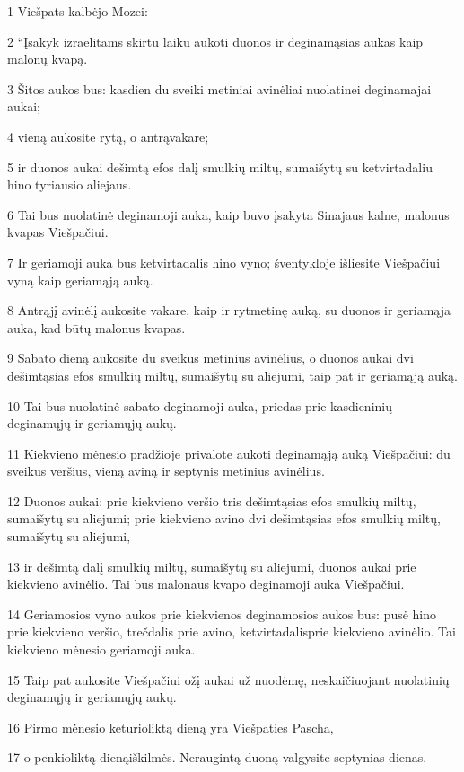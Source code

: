 \par 1 Viešpats kalbėjo Mozei: 
\par 2 “Įsakyk izraelitams skirtu laiku aukoti duonos ir deginamąsias aukas kaip malonų kvapą. 
\par 3 Šitos aukos bus: kasdien du sveiki metiniai avinėliai nuolatinei deginamajai aukai; 
\par 4 vieną aukosite rytą, o antrą­vakare; 
\par 5 ir duonos aukai dešimtą efos dalį smulkių miltų, sumaišytų su ketvirtadaliu hino tyriausio aliejaus. 
\par 6 Tai bus nuolatinė deginamoji auka, kaip buvo įsakyta Sinajaus kalne, malonus kvapas Viešpačiui. 
\par 7 Ir geriamoji auka bus ketvirtadalis hino vyno; šventykloje išliesite Viešpačiui vyną kaip geriamąją auką. 
\par 8 Antrąjį avinėlį aukosite vakare, kaip ir rytmetinę auką, su duonos ir geriamąja auka, kad būtų malonus kvapas. 
\par 9 Sabato dieną aukosite du sveikus metinius avinėlius, o duonos aukai­ dvi dešimtąsias efos smulkių miltų, sumaišytų su aliejumi, taip pat ir geriamąją auką. 
\par 10 Tai bus nuolatinė sabato deginamoji auka, priedas prie kasdieninių deginamųjų ir geriamųjų aukų. 
\par 11 Kiekvieno mėnesio pradžioje privalote aukoti deginamąją auką Viešpačiui: du sveikus veršius, vieną aviną ir septynis metinius avinėlius. 
\par 12 Duonos aukai: prie kiekvieno veršio tris dešimtąsias efos smulkių miltų, sumaišytų su aliejumi; prie kiekvieno avino dvi dešimtąsias efos smulkių miltų, sumaišytų su aliejumi, 
\par 13 ir dešimtą dalį smulkių miltų, sumaišytų su aliejumi, duonos aukai prie kiekvieno avinėlio. Tai bus malonaus kvapo deginamoji auka Viešpačiui. 
\par 14 Geriamosios vyno aukos prie kiekvienos deginamosios aukos bus: pusė hino prie kiekvieno veršio, trečdalis­ prie avino, ketvirtadalis­prie kiekvieno avinėlio. Tai kiekvieno mėnesio geriamoji auka. 
\par 15 Taip pat aukosite Viešpačiui ožį aukai už nuodėmę, neskaičiuojant nuolatinių deginamųjų ir geriamųjų aukų. 
\par 16 Pirmo mėnesio keturioliktą dieną yra Viešpaties Pascha, 
\par 17 o penkioliktą dieną­iškilmės. Neraugintą duoną valgysite septynias dienas. 
